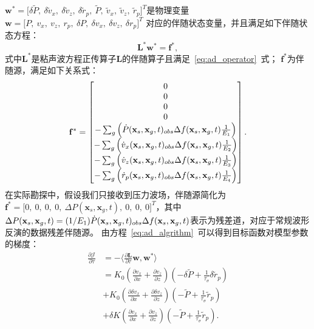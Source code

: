 $\mathbf{w}^\ast=\lbrack \delta\tilde{P}, \ \delta \tilde{v}_x, \ \delta \tilde{v}_z, \
\delta \tilde{r}_p, \ \tilde{P}, \ \tilde{v}_x, \ \tilde{v}_z, \ \tilde{r}_p\rbrack ^T$是物理变量
$\mathbf{w}=\lbrack P, \ v_x, \ v_z, \ r_p, \ \delta P, \ \delta v_x, \ \delta v_z, \ \delta r_p\rbrack ^T$
对应的伴随状态变量，并且满足如下伴随状态方程：
\begin{equation}
	\mathbf{L}^\ast\mathbf{w}^\ast=\mathbf{f}^\ast,
\end{equation}
式中$\mathbf{L}^\ast$是粘声波方程正传算子$\mathbf{L}$的伴随算子且满足~\ref{eq:ad_operator}~式；
$\mathbf{f}^\ast$为伴随源，满足如下关系式：
\begin{equation}
	\mathbf{f}^\ast=\begin{bmatrix} 0 \cr 0\cr 0\cr 0\cr
		-\sum_g\left(\dot{P}(\mathbf{x}_s,\mathbf{x}_g,t)_{obs}
		\Delta f(\mathbf{x}_s,\mathbf{x}_g,t)\frac{1}{E_1}\right) \cr
		-\sum_g\left(\dot{v}_x(\mathbf{x}_s,\mathbf{x}_g,t)_{obs}
		\Delta f(\mathbf{x}_s,\mathbf{x}_g,t)\frac{1}{E_2}\right) \cr
		-\sum_g\left(\dot{v}_z(\mathbf{x}_s,\mathbf{x}_g,t)_{obs}
		\Delta f(\mathbf{x}_s,\mathbf{x}_g,t)\frac{1}{E_3}\right) \cr
		-\sum_g\left(\dot{r}_p(\mathbf{x}_s,\mathbf{x}_g,t)_{obs}
		\Delta f(\mathbf{x}_s,\mathbf{x}_g,t)\frac{1}{E_4}\right) 
	\end{bmatrix}.
\end{equation}
在实际勘探中，假设我们只接收到压力波场，伴随源简化为\\
 $\mathbf{f}^\ast=\lbrack 0, \ 0, \ 0, \ 0, \
\Delta P(\mathbf{x}_s,\mathbf{x}_g,t), \ 0, \ 0, \ 0\rbrack ^T$，其中
$\Delta P(\mathbf{x}_s,\mathbf{x}_g,t)=(1/E_1)\dot{P}(\mathbf{x}_s,\mathbf{x}_g,t)_{obs}
 \\ \Delta f(\mathbf{x}_s,\mathbf{x}_g,t)$表示为残差道，对应于常规波形反演的数据残差伴随源。
由方程~\ref{eq:ad_algrithm}~可以得到目标函数对模型参数的梯度：
   \begin{equation}
    \begin{aligned}
        \frac{\partial \mathcal{J}}{\partial \tau} &= -\langle\frac{\partial \mathbf{L}}{\partial\tau}
        \mathbf{w},\mathbf{w}^\ast \rangle \\
        &= {K_0(\frac{\partial v_x}{\partial
        x}+\frac{\partial v_z}{\partial
    z})(-\delta\tilde{P}+\frac{1}{\tau_\sigma}\delta\tilde{r}_p)} \\
    &{+K_0(\frac{\partial \delta v_x}{\partial x}+\frac{\partial \delta
        v_z}{\partial z})(-\tilde{P}+\frac{1}{\tau_\sigma}\tilde{r}_p)} \\
        &{+\delta K(\frac{\partial v_x}{\partial x}+\frac{\partial v_z}{\partial
        z})(-\tilde{P}+\frac{1}{\tau_\sigma}\tilde{r}_p)}.
    \end{aligned}
    \label{eq:gradient1}
    \end{equation}

